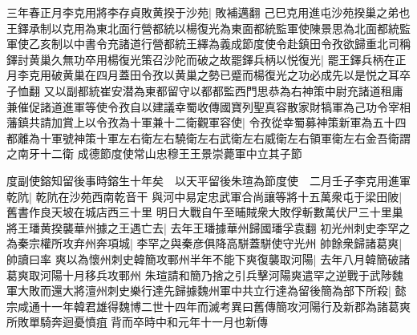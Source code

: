 三年春正月李克用將李存貞敗黄揆于沙苑|{
	敗補邁翻}
己巳克用進屯沙苑揆巢之弟也王鐸承制以克用為東北面行營都統以楊復光為東面都統監軍使陳景思為北面都統監軍使乙亥制以中書令充諸道行營都統王繹為義成節度使令赴鎮田令孜欲歸重北司稱鐸討黄巢久無功卒用楊復光策召沙陀而破之故罷鐸兵柄以悦復光|{
	罷王鐸兵柄在正月李克用破黄巢在四月蓋田令孜以黄巢之勢已蹙而楊復光之功必成先以是悦之耳卒子恤翻}
又以副都統崔安潜為東都留守以都都監西門思恭為右神策中尉充諸道租庸兼催促諸道進軍等使令孜自以建議幸蜀收傳國寶列聖真容散家財犒軍為己功令宰相藩鎮共請加賞上以令孜為十軍兼十二衛觀軍容使|{
	令孜從幸蜀募神策新軍為五十四都離為十軍號神策十軍左右衛左右驍衛左右武衛左右威衛左右領軍衛左右金吾衛謂之南牙十二衛}
成德節度使常山忠穆王王景崇薨軍中立其子節

度副使鎔知留後事時鎔生十年矣　以天平留後朱瑄為節度使　二月壬子李克用進軍乾阬|{
	乾阬在沙苑西南乾音干}
與河中易定忠武軍合尚讓等將十五萬衆屯于梁田陂|{
	舊書作良天坡在城店西三十里}
明日大戰自午至晡賊衆大敗俘斬數萬伏尸三十里巢將王璠黄揆襲華州據之王遇亡去|{
	去年王璠據華州歸國璠孚袁翻}
初光州刺史李罕之為秦宗權所攻弃州奔項城|{
	李罕之與秦彦俱降高駢蓋駢使守光州}
帥餘衆歸諸葛爽|{
	帥讀曰率}
爽以為懷州刺史韓簡攻鄆州半年不能下爽復襲取河陽|{
	去年八月韓簡破諸葛爽取河陽十月移兵攻鄆州}
朱瑄請和簡乃捨之引兵擊河陽爽遣罕之逆戰于武陟魏軍大敗而還大將澶州刺史樂行達先歸據魏州軍中共立行達為留後簡為部下所殺|{
	懿宗咸通十一年韓君雄得魏博二世十四年而滅考異曰舊傳簡攻河陽行及新郡為諸葛爽所敗單騎奔迴憂憤疽背而卒時中和元年十一月也新傳}


